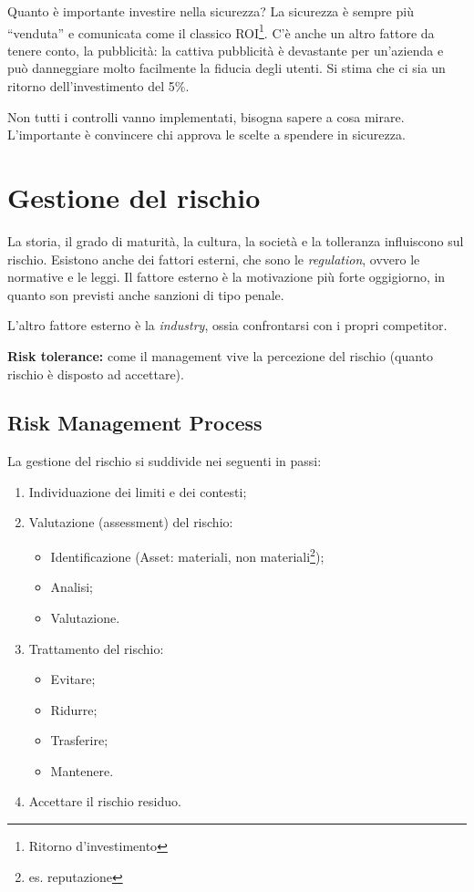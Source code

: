 \label{riskMng}

Quanto è importante investire nella sicurezza? La sicurezza è sempre più
``venduta'' e comunicata come il classico ROI\footnote{Ritorno d'investimento}.
C'è anche un altro fattore da tenere conto, la pubblicità: la cattiva
pubblicità è devastante per un'azienda e può danneggiare molto
facilmente la fiducia degli utenti. Si stima che ci sia un ritorno
dell'investimento del 5\%.

Non tutti i controlli vanno implementati, bisogna sapere a cosa mirare.
L'importante è convincere chi approva le scelte a spendere in sicurezza.



\chapter{Gestione del rischio}

La storia, il grado di maturità, la cultura, la società e la tolleranza
influiscono sul rischio. Esistono anche dei fattori esterni, che sono le
\textit{regulation}, ovvero le normative e le leggi. Il fattore esterno è la
motivazione più forte oggigiorno, in quanto son previsti anche sanzioni di tipo
penale.

L'altro fattore esterno è la \textit{industry}, ossia confrontarsi con i propri
competitor.

\textbf{Risk tolerance:} come il management vive la percezione del rischio
(quanto rischio è disposto ad accettare).

\section{Risk Management Process}
La gestione del rischio si suddivide nei seguenti in passi:
\begin{enumerate}
\item Individuazione dei limiti e dei contesti;
\item Valutazione (assessment) del rischio:
\begin{itemize}
  \item Identificazione (Asset: materiali, non
  materiali\footnote{es. reputazione});
  \item Analisi;
  \item Valutazione.
\end{itemize}
\item Trattamento del rischio:
\begin{itemize}
  \item Evitare;
  \item Ridurre;
  \item Trasferire;
  \item Mantenere.
\end{itemize}
\item Accettare il rischio residuo.
\end{enumerate}

